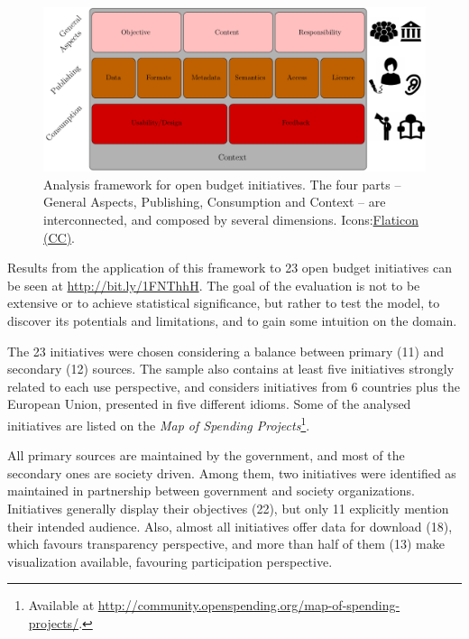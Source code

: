 \begin{figure}[ht]
\begin{center}
\includegraphics[scale=0.75]{images/model.pdf}
\caption[Analysis framework open budget initiatives.]{Analysis framework for open budget initiatives. The four parts -- General Aspects, Publishing, Consumption and Context -- are interconnected, and composed by several dimensions. Icons:\href{http://www.flaticon.com/authors/icomoon}{Flaticon (CC)}.}
\label{fig:framework}
\end{center}
\end{figure}


Results from the application of this framework to 23 open budget initiatives can be seen at \url{http://bit.ly/1FNThhH}.
The goal of the evaluation is not to be extensive or to achieve statistical significance, but rather to test the model, to discover its potentials and limitations, and to gain some intuition on the domain.

The 23 initiatives were chosen considering a balance between primary (11) and secondary (12) sources. 
The sample also contains at least five initiatives strongly related to each use perspective, and considers initiatives from 6 countries plus the European Union, presented in five different idioms. Some of the analysed initiatives are listed on the \emph{Map of Spending Projects}\footnote{Available at \url{http://community.openspending.org/map-of-spending-projects/}.}.

All primary sources are maintained by the government, and most of the secondary ones are society driven. 
Among them, two initiatives were identified as maintained in partnership between government and society organizations. 
Initiatives generally display their objectives (22), but only 11 explicitly mention their intended audience. 
Also, almost all initiatives offer data for download (18), which favours transparency perspective, and more than half of them (13) make visualization available, favouring participation perspective.

